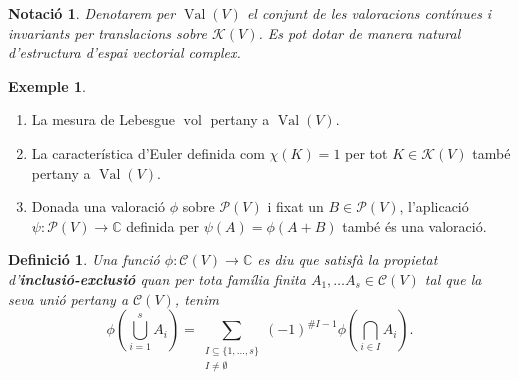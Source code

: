 \documentclass{article}
\newtheorem{definicio}{Definici\'{o}}
\newtheorem{notacio}{Notaci\'{o}}
\theoremstyle{definition}
\newtheorem{exemple}{Exemple}
\DeclareMathOperator{\Val}{Val}
\DeclareMathOperator{\vol}{vol}
\begin{document}
%
%
%
%
\begin{notacio}
Denotarem per $\Val(V)$ el conjunt de les valoracions cont\'{i}nues i invariants per translacions sobre $\mathcal{K}(V)$. Es pot dotar de manera natural d'estructura d'espai vectorial complex.
\end{notacio}

\begin{exemple}\label{Exe:valoracions}
\begin{enumerate}
    \item\label{Exe:Lebesgue} La mesura de Lebesgue $\vol$ pertany a $\Val(V)$.
    \item\label{Exe:Euler} La caracter\'{i}stica d'Euler definida com $\chi(K)=1$ per tot $K\in\mathcal{K}(V)$ tamb\'{e} pertany a $\Val(V)$.
    \item\label{Exe:Minkowski} Donada una valoraci\'{o} $\phi$ sobre $\mathcal{P}(V)$ i fixat un $B\in\mathcal{P}(V)$, l'aplicaci\'{o} $\psi:\mathcal{P}(V)\rightarrow\mathbb{C}$ definida per $\psi(A)=\phi(A+B)$ tamb\'{e} \'{e}s una valoraci\'{o}.
\end{enumerate}
\end{exemple}

\begin{definicio}
Una funci\'{o} $\phi:\mathcal{C}(V)\rightarrow\mathbb{C}$ es diu que satisf\`{a} la propietat d'\textbf{inclusi\'{o}-exclusi\'{o}} quan per tota fam\'{i}lia finita $A_1,\ldots A_s\in\mathcal{C}(V)$ tal que la seva uni\'{o} pertany a $\mathcal{C}(V)$, tenim
\[\phi\left(\bigcup_{i=1}^sA_i\right)=\sum_{\substack{I\subseteq\{1,\ldots,s\}\\I\neq\emptyset}}(-1)^{\#I-1}\phi\left(\bigcap_{i\in I}A_i\right).\]
\end{definicio}
\end{document}
